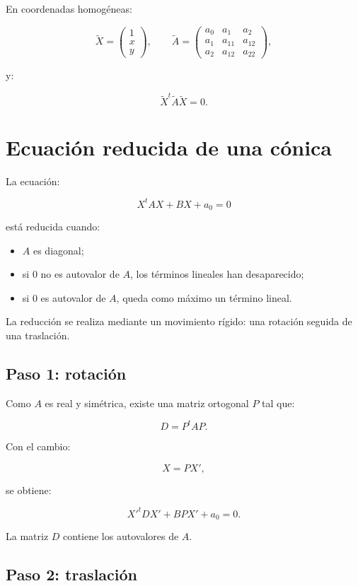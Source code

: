 \documentclass[11pt,a4paper]{article}
\begin{document}
En coordenadas homogéneas:

\[
\widetilde X=
\begin{pmatrix}
1\\x\\y
\end{pmatrix},
\qquad
\widetilde A=
\begin{pmatrix}
a_0&a_1&a_2\\
a_1&a_{11}&a_{12}\\
a_2&a_{12}&a_{22}
\end{pmatrix},
\]

y:

\[
\boxed{
\widetilde X^t\widetilde A\widetilde X=0.
}
\]

\section{Ecuación reducida de una cónica}

La ecuación:

\[
X^tAX+BX+a_0=0
\]

está reducida cuando:

\begin{itemize}
\item $A$ es diagonal;
\item si $0$ no es autovalor de $A$, los términos lineales han desaparecido;
\item si $0$ es autovalor de $A$, queda como máximo un término lineal.
\end{itemize}

La reducción se realiza mediante un movimiento rígido: una rotación seguida de una traslación.

\subsection{Paso 1: rotación}

Como $A$ es real y simétrica, existe una matriz ortogonal $P$ tal que:

\[
\boxed{
D=P^tAP.
}
\]

Con el cambio:

\[
X=PX',
\]

se obtiene:

\[
\boxed{
X'^tDX'+BPX'+a_0=0.
}
\]

La matriz $D$ contiene los autovalores de $A$.

\subsection{Paso 2: traslación}
\end{document}
